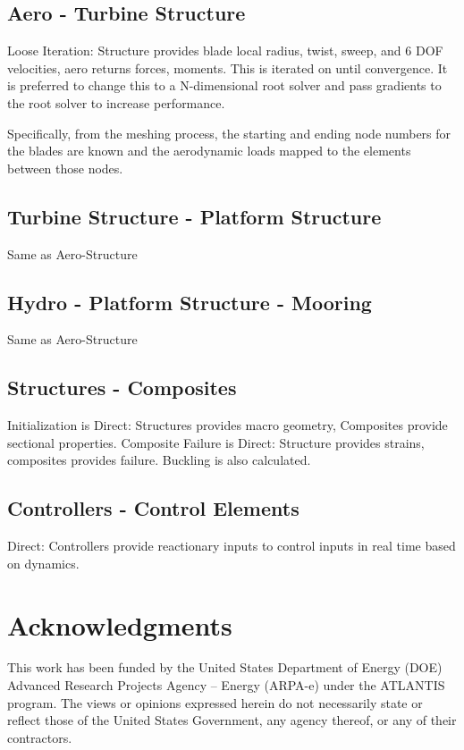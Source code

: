 \documentclass[11pt]{article}
\begin{document}
\subsection{Aero - Turbine Structure}
Loose Iteration: Structure provides blade local radius, twist, sweep, and 6 DOF velocities, aero returns forces, moments. This is iterated on until convergence.  It is preferred to change this to a N-dimensional root solver and pass gradients to the root solver to increase performance.

Specifically, from the meshing process, the starting and ending node numbers for the blades are known and the aerodynamic loads mapped to the elements between those nodes.

\subsection{Turbine Structure - Platform Structure}
Same as Aero-Structure
\subsection{Hydro - Platform Structure - Mooring}
Same as Aero-Structure
\subsection{Structures - Composites}
Initialization is Direct: Structures provides macro geometry, Composites provide sectional properties. Composite Failure is Direct: Structure provides strains, composites provides failure.  Buckling is also calculated.
\subsection{Controllers - Control Elements}
Direct: Controllers provide reactionary inputs to control inputs in real time based on dynamics.

\section*{Acknowledgments}
This work has been funded by the United States Department of Energy (DOE) Advanced Research Projects Agency – Energy (ARPA-e) under the ATLANTIS program. The views or opinions expressed herein do not necessarily state or reflect those of the United States Government, any agency thereof, or any of their contractors.


\end{document}
